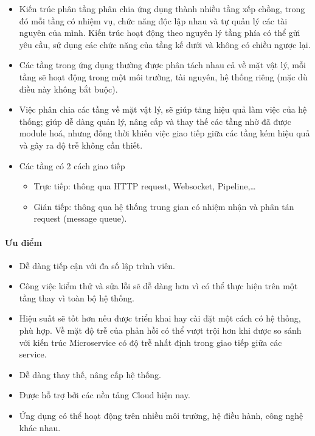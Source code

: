 \begin{itemize}
    \item Kiến trúc phân tầng phân chia ứng dụng thành nhiều tầng xếp chồng, trong đó mỗi tầng có nhiệm vụ, chức năng độc lập nhau và tự quản lý các tài nguyên của mình. Kiến trúc hoạt động theo nguyên lý tầng phía có thể gửi yêu cầu, sử dụng các chức năng của tầng kế dưới và không có chiều ngược lại.
    \item Các tầng trong ứng dụng thường được phân tách nhau cả về mặt vật lý, mỗi tầng sẽ hoạt động trong một môi trường, tài nguyên, hệ thống riêng (mặc dù điều này không bắt buộc). 
    \item Việc phân chia các tầng về mặt vật lý, sẽ giúp tăng hiệu quả làm việc của hệ thống; giúp dễ dàng quản lý, nâng cấp và thay thế các tầng nhờ đã được module hoá, nhưng đồng thời khiến việc giao tiếp giữa các tầng kém hiệu quả và gây ra độ trễ không cần thiết.
    \item Các tầng có 2 cách giao tiếp
    \begin{itemize}
        \item Trực tiếp: thông qua HTTP request, Websocket, Pipeline,…
        \item Gián tiếp: thông qua hệ thống trung gian có nhiệm nhận và phân tán request (message queue).
    \end{itemize}
\end{itemize}

\paragraph{Ưu điểm}

\begin{itemize}
    \item Dễ dàng tiếp cận với đa số lập trình viên.
    \item Công việc kiểm thử và sửa lỗi sẽ dễ dàng hơn vì có thể thực hiện trên một tầng thay vì toàn bộ hệ thống.
    \item Hiệu suất sẽ tốt hơn nếu được triển khai hay cài đặt một cách có hệ thống, phù hợp. Về mặt độ trễ của phản hồi có thể vượt trội hơn khi được so sánh với kiến trúc Microservice có độ trễ nhất định trong giao tiếp giữa các service.
    \item Dễ dàng thay thế, nâng cấp hệ thống.
    \item Được hỗ trợ bởi các nền tảng Cloud hiện nay.
    \item Ứng dụng có thể hoạt động trên nhiều môi trường, hệ điều hành, công nghệ khác nhau.
\end{itemize}

